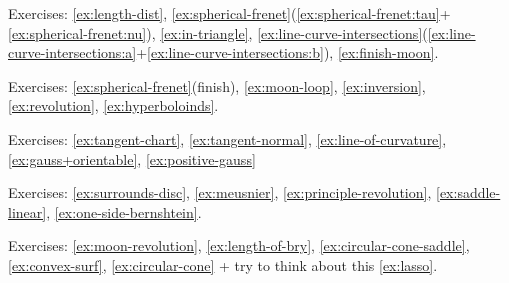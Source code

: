 Exercises:
\ref{ex:length-dist},
\ref{ex:spherical-frenet}(\ref{ex:spherical-frenet:tau}+\ref{ex:spherical-frenet:nu}),
\ref{ex:in-triangle},
\ref{ex:line-curve-intersections}(\ref{ex:line-curve-intersections:a}+\ref{ex:line-curve-intersections:b}),
\ref{ex:finish-moon}.

Exercises:
\ref{ex:spherical-frenet}(finish),
\ref{ex:moon-loop},
\ref{ex:inversion},
\ref{ex:revolution},
\ref{ex:hyperboloinds}.

Exercises:
\ref{ex:tangent-chart},
\ref{ex:tangent-normal},
\ref{ex:line-of-curvature},
\ref{ex:gauss+orientable},
\ref{ex:positive-gauss}

Exercises:
\ref{ex:surrounds-disc},
\ref{ex:meusnier},
\ref{ex:principle-revolution},
\ref{ex:saddle-linear},
\ref{ex:one-side-bernshtein}.

Exercises:
\ref{ex:moon-revolution}, 
\ref{ex:length-of-bry},
\ref{ex:circular-cone-saddle},
\ref{ex:convex-surf},
\ref{ex:circular-cone} 
+ try to think about this \ref{ex:lasso}.
